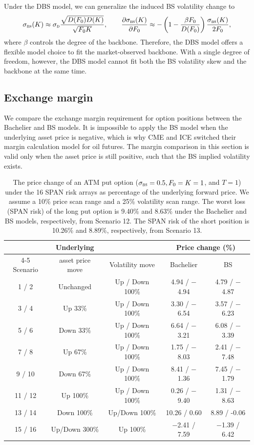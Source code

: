 \documentclass[a4paper,review]{elsarticle}
\newcommand{\sigmad}{\sigma_\textsc{d}}
\newcommand{\sigmabs}{\sigma_\textsc{bs}}
\begin{document}
Under the DBS model, we can generalize the induced BS volatility change to
$$ \sigmabs(K) \approx \sigmad \frac{\sqrt{D(F_0) D(K)}}{\sqrt{F_0 K}}, \qquad \frac{\partial \sigmabs(K)}{\partial F_0} \approx -\left(1-\frac{\beta F_0}{D(F_0)}\right)\frac{\sigmabs(K)}{2F_0},
$$
where $\beta$ controls the degree of the backbone. Therefore, the DBS model offers a flexible model choice to fit the market-observed backbone. With a single degree of freedom, however, the DBS model cannot fit both the BS volatility skew and the backbone at the same time.

\subsection{Exchange margin} \label{ssec:margin}\noindent
We compare the exchange margin requirement for option positions between the Bachelier and BS models. It is impossible to apply the BS model when the underlying asset price is negative, which is why CME and ICE switched their margin calculation model for oil futures. The margin comparison in this section is valid only when the asset price is still positive, such that the BS implied volatility exists.

\begin{table}
	\caption{\label{tab:span} The price change of an ATM put option ($\sigmabs = 0.5, F_0=K=1$, and $T=1$) under the 16 SPAN risk arrays as percentage of the underlying forward price. We assume a 10\% price scan range and a 25\% volatility scan range. The worst loss (SPAN risk) of the long put option is 9.40\% and 8.63\% under the Bachelier and BS models, respectively, from Scenario 12. The SPAN risk of the short position is 10.26\% and 8.89\%, respectively, from Scenario 13.} \vspace{1ex}
	\centering \small
	\begin{tabular}{|c||c|c|c|c|} \hline 
		& Underlying &  & \multicolumn{2}{c|}{Price change (\%)} \\ \cline{4-5}
		Scenario & asset price move & Volatility move & Bachelier & BS \\
		\hline
		1 / 2 & Unchanged & Up / Down 100\% & 4.94 / $-$4.94 & 4.79 / $-$4.87 \\ \hline
		3 / 4 & Up 33\% & Up / Down 100\% & 3.30 / $-$6.54 & 3.57 / $-$6.23 \\ \hline
		5 / 6 & Down 33\% & Up / Down 100\% & 6.64 / $-$3.21 & 6.08 / $-$3.39 \\ \hline
		7 / 8 & Up 67\% & Up / Down 100\% & 1.75 / $-$8.03 & 2.41 / $-$7.48 \\ \hline
		9 / 10 & Down 67\% & Up / Down 100\% & 8.41 / $-$1.36 & 7.45 / $-$1.79 \\ \hline
		11 / 12 & Up 100\% & Up / Down 100\% & 0.26 / $-$9.40 & 1.31 / $-$8.63 \\ \hline
		13 / 14 & Down 100\% & Up/Down 100\% & 10.26 / 0.60 & 8.89 / -0.06 \\ \hline
		15 / 16 & Up/Down 300\% & Up 100\% & $-$2.41 / 7.59 & $-$1.39 / 6.42 \\ \hline
	\end{tabular}
\end{table}
\end{document}
